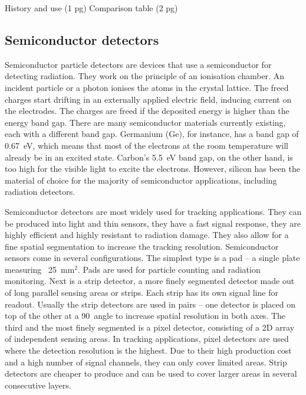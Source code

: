\documentclass[twoside,12pt]{packages/mytustyle}  %
\begin{document}
History and use (1 pg)
Comparison table (2 pg)


\subsection{Semiconductor detectors}
Semiconductor particle detectors are devices that use a semiconductor for detecting radiation. They work on the principle of an ionisation chamber. An incident particle or a photon ionises the atoms in the crystal lattice. The freed charges start drifting in an externally applied electric field, inducing current on the electrodes. The charges are freed if the deposited energy is higher than the energy band gap. There are many semiconductor materials currently existing, each with a different band gap. Germanium (Ge), for instance, has a band gap of 0.67~eV, which means that most of the electrons at the room temperature will already be in an excited state. Carbon's 5.5~eV band gap, on the other hand, is too high for the visible light to excite the electrons. However, silicon has been the material of choice for the majority of semiconductor applications, including radiation detectors. 

Semiconductor detectors are most widely used for tracking applications. They can be produced into light and thin sensors, they have a fast signal response, they are highly efficient and highly resistant to radiation damage. They also allow for a fine spatial segmentation to increase the tracking resolution. Semiconductor sensors come in several configurations. The simplest type is a pad -- a single plate measuring ~25~mm$^2$. Pads are used for particle counting and radiation monitoring. Next is a strip detector, a more finely segmented detector made out of long parallel sensing areas or strips. Each strip has its own signal line for readout. Usually the strip detectors are used in pairs -- one detector is placed on top of the other at a 90\textdegree~angle to increase spatial resolution in both axes. The third and the most finely segmented is a pixel detector, consisting of a 2D array of independent sensing areas. In tracking applications, pixel detectors are used where the detection resolution is the highest. Due to their high production cost and a high number of signal channels, they can only cover limited areas. Strip detectors are cheaper to produce and can be used to cover larger areas in several consecutive layers.
\end{document}
